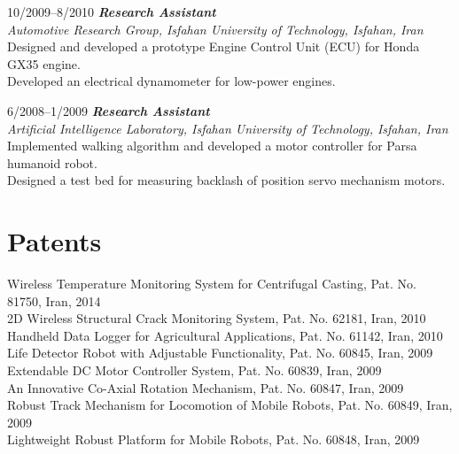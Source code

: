 \documentclass[10pt]{article}
\newlength{\Vspace}
\newlength{\Vspace}
\begin{document}
\begin{CV}
\item[10/2009--8/2010] \textbf{\textit{Research Assistant}} \\
    \textit{Automotive Research Group, Isfahan University of Technology, Isfahan, Iran}\vspace{\Vspace} \\
    Designed and developed a prototype Engine Control Unit (ECU) for Honda GX35 engine. \\
    Developed an electrical dynamometer for low-power engines.

\item[6/2008--1/2009] \textbf{\textit{Research Assistant}} \\
    \textit{Artificial Intelligence Laboratory, Isfahan University of Technology, Isfahan, Iran}\vspace{\Vspace} \\
    Implemented walking algorithm and developed a motor controller for Parsa humanoid robot. \\
    Designed a test bed for measuring backlash of position servo mechanism motors.

\end{CV}

\section{Patents}

\begin{flushleft}

Wireless Temperature Monitoring System for Centrifugal Casting, Pat. No. 81750, Iran, 2014 \vspace{\Vspace} \\
2D Wireless Structural Crack Monitoring System, Pat. No. 62181, Iran, 2010 \vspace{\Vspace} \\
Handheld Data Logger for Agricultural Applications, Pat. No. 61142, Iran, 2010 \vspace{\Vspace} \\
Life Detector Robot with Adjustable Functionality, Pat. No. 60845, Iran, 2009 \vspace{\Vspace} \\
Extendable DC Motor Controller System, Pat. No. 60839, Iran, 2009 \vspace{\Vspace} \\
An Innovative Co-Axial Rotation Mechanism, Pat. No. 60847, Iran, 2009 \vspace{\Vspace} \\
Robust Track Mechanism for Locomotion of Mobile Robots, Pat. No. 60849, Iran, 2009 \vspace{\Vspace} \\
Lightweight Robust Platform for Mobile Robots, Pat. No. 60848, Iran, 2009

\end{flushleft}
\end{document}
